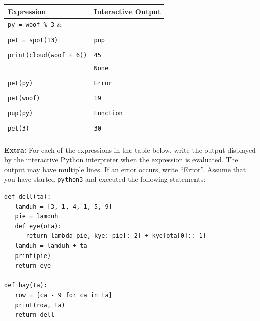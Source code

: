 \documentclass{exam}
\begin{document}
\begin{questions}
\begin{solution}
\begin{center}
    \begin{tabular}{|m{8cm}|m{6cm}|}
\hline
\textbf{Expression} & \textbf{Interactive Output} \\
\hline
\lstinline$py = woof % 3$ &  \\ & \\
\hline
\lstinline$pet = spot(13)$ & \color{red}\texttt{pup} \\ & \\
\hline
\lstinline$print(cloud(woof + 6))$ & \color{red}\texttt{45}\\ & \color{red}\texttt{None}\\ & \\
\hline
\lstinline$pet(py)$ & \color{red}\texttt{Error}\\ & \\
\hline
\lstinline$pet(woof)$& \color{red}\texttt{19}\\ & \\
\hline
\lstinline$pup(py)$ & \color{red}\texttt{Function}\\ & \\
\hline
\lstinline$pet(3)$ & \color{red}\texttt{30}\\ & \\
\hline
\end{tabular}
\end{center}
\end{solution}

\clearpage

\item \textbf{Extra:}
For each of the expressions in the table below, write the output displayed by the interactive Python interpreter when the expression is evaluated. The output may have multiple lines. If an error occurs, write “Error”.
Assume that you have started \texttt{python3} and executed the following statements:

\begin{lstlisting}
def dell(ta):
   lamduh = [3, 1, 4, 1, 5, 9]
   pie = lamduh
   def eye(ota):
      return lambda pie, kye: pie[:-2] + kye[ota[0]::-1]
   lamduh = lamduh + ta
   print(pie)
   return eye

def bay(ta):
   row = [ca - 9 for ca in ta]
   print(row, ta)
   return dell
 

\end{lstlisting}
\end{questions}
\end{document}
